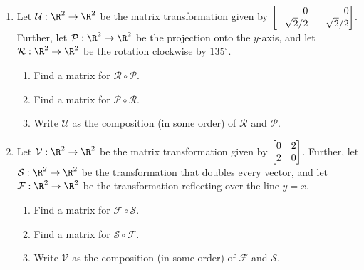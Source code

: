 
\begin{exercises}

	\begin{problist}
		\prob
		\begin{enumerate}
			\item Let $\mathcal U:\R^{2}\to\R^{2}$
				be the matrix transformation
				given by $\mat{0&0\\-\sqrt{2}/2
				& -\sqrt{2}/2}$. Further,
				let
				$\mathcal P:\R^{2}\to\R^{2}$
				be the projection onto the
				$y$-axis, and let $\mathcal
				R:\R^{2}\to\R^{2}$ be the rotation
				clockwise by $135^{\circ}$.
				\begin{enumerate}
					\item Find a matrix for
						$\mathcal R
						\circ
						\mathcal P$.

					\item Find a matrix for
						$\mathcal P
						\circ
						\mathcal R$.

					\item Write $\mathcal
						U$ as the composition
						(in some order)
						of $\mathcal
						R$ and $\mathcal
						P$.
				\end{enumerate}

			\item Let $\mathcal V:\R^{2}\to\R^{2}$
				be the matrix transformation
				given by $\mat{0&2\\2&0}$.
				Further, let
				$\mathcal S:\R^{2}\to\R^{2}$
				be the transformation that
				doubles every vector, and
				let
				$\mathcal F:\R^{2}\to\R^{2}$
				be the transformation
				reflecting over the line
				$y=x$.
				\begin{enumerate}
					\item Find a matrix for
						$\mathcal F
						\circ
						\mathcal S$.

					\item Find a matrix for
						$\mathcal S
						\circ
						\mathcal F$.

					\item Write $\mathcal
						V$ as the composition
						(in some order)
						of $\mathcal
						F$ and $\mathcal
						S$.
				\end{enumerate}
		\end{enumerate}


		\begin{solution}


\end{solution}
\end{problist}
\end{exercises}
